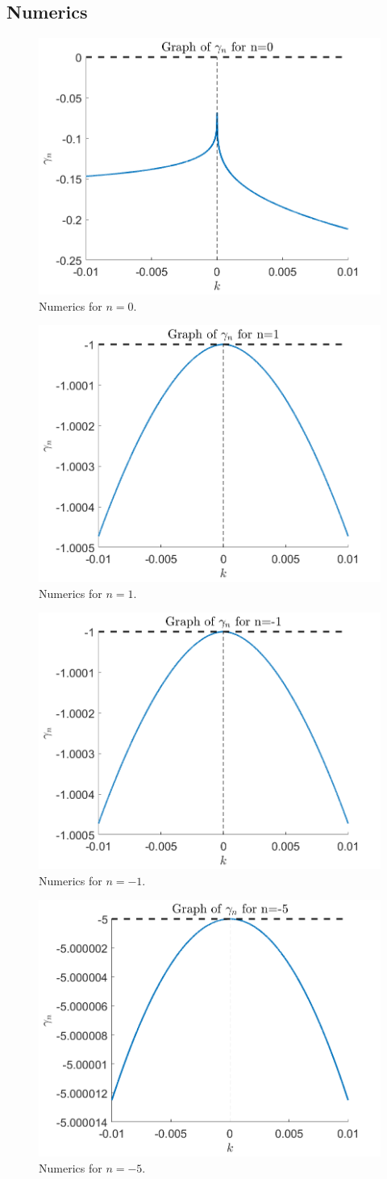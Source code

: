 \documentclass[]{article}
\begin{document}
	\subsection{Numerics}
	\begin{figure}
		\centering
		\includegraphics[width = .5\textwidth]{../Numerics/gamma_n0}
		\caption{Numerics for $n = 0$.}
	\end{figure}
	\begin{figure}
		\centering
		\includegraphics[width = .5\textwidth]{../Numerics/gamma_n1}
		\caption{Numerics for $n = 1$.}
	\end{figure}
		\begin{figure}
		\centering
		\includegraphics[width = .5\textwidth]{../Numerics/gamma_n-1}
		\caption{Numerics for $n = -1$.}
	\end{figure}
	\begin{figure}
		\centering
		\includegraphics[width = .5\textwidth]{../Numerics/gamma_n-5}
		\caption{Numerics for $n = -5$.}
	\end{figure}
\end{document}
